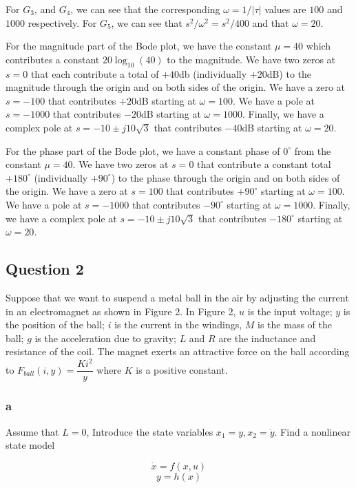 \documentclass[11pt]{article}
\begin{document}
For $G_3$, and $G_4$, we can see that the corresponding $\omega = 1/|\tau|$ values are $100$ and $1000$ respectively. For $G_5$, we can see that $s^2 / \omega^2 = s^2 / 400$ and that $\omega = 20$.

For the magnitude part of the Bode plot, we have the constant $\mu = 40$ which contributes a constant $20 \log_{10}(40)$ to the magnitude. We have two zeros at $s = 0$ that each contribute a total of $+40$db (individually $+20$dB) to the magnitude through the origin and on both sides of the origin. We have a zero at $s = -100$ that contributes $+20$dB starting at $\omega = 100$. We have a pole at $s = -1000$ that contributes $-20$dB starting at $\omega = 1000$. Finally, we have a complex pole at $s = -10 \pm j 10 \sqrt{3}$ that contributes $-40$dB starting at $\omega = 20$.

For the phase part of the Bode plot, we have a constant phase of $0^\circ$ from the constant $\mu = 40$. We have two zeros at $s = 0$ that contribute a constant total $+180^\circ$ (individually $+90^\circ$) to the phase through the origin and on both sides of the origin. We have a zero at $s = 100$ that contributes $+90^\circ$ starting at $\omega = 100$. We have a pole at $s = -1000$ that contributes $-90^\circ$ starting at $\omega = 1000$. Finally, we have a complex pole at $s = -10 \pm j 10 \sqrt{3}$ that contributes $-180^\circ$ starting at $\omega = 20$.

\subsection{Question 2}

Suppose that we want to suspend a metal ball in the air by adjusting the current in an electromagnet as shown in Figure 2. In Figure 2, $u$ is the input voltage; $y$ is the position of the ball; $i$ is the current in the windings, $M$ is the mass of the ball; $g$ is the acceleration due to gravity; $L$ and $R$ are the inductance and resistance of the coil. The magnet exerts an attractive force on the ball according to $F_{ball}(i, y) = \dfrac{Ki^2}{y}$ where $K$ is  a positive constant.

\subsubsection{a}

Assume that $L = 0$, Introduce the state variables $x_1 = y, x_2 = \dot y$. Find a nonlinear state model

\[ \dot x = f(x, u) \]
\[ y = h(x) \]
\end{document}

